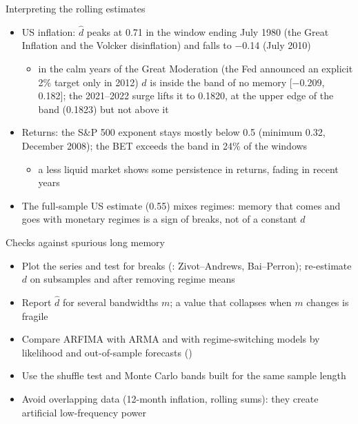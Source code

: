 \begin{frame}{Interpreting the rolling estimates}
\itemsize{\small}
\begin{itemize}
    \item US inflation: $\hat d$ peaks at 0.71 in the window ending July 1980 (the Great Inflation and the Volcker disinflation) and falls to $-$0.14 (July 2010)
    \begin{itemize}
        \item in the calm years of the Great Moderation (the Fed announced an explicit 2\% target only in 2012) $d$ is inside the band of no memory [$-$0.209, 0.182]; the 2021--2022 surge lifts it to 0.1820, at the upper edge of the band (0.1823) but not above it
    \end{itemize}
    \item Returns: the S\&P 500 exponent stays mostly below 0.5 (minimum 0.32, December 2008); the BET exceeds the band in 24\% of the windows
    \begin{itemize}
        \item a less liquid market shows some persistence in returns, fading in recent years
    \end{itemize}
    \item The full-sample US estimate (0.55) mixes regimes: memory that comes and goes with monetary regimes is a sign of breaks, not of a constant $d$
\end{itemize}
\end{frame}

\begin{frame}{Checks against spurious long memory}
\itemsize{\small}
\begin{itemize}
    \item Plot the series and test for breaks (: Zivot--Andrews, Bai--Perron); re-estimate $d$ on subsamples and after removing regime means
    \item Report $\hat d$ for several bandwidths $m$; a value that collapses when $m$ changes is fragile
    \item Compare ARFIMA with ARMA and with regime-switching models by likelihood and out-of-sample forecasts ()
    \item Use the shuffle test and Monte Carlo bands built for the same sample length
    \item Avoid overlapping data (12-month inflation, rolling sums): they create artificial low-frequency power
\end{itemize}
\end{frame}

